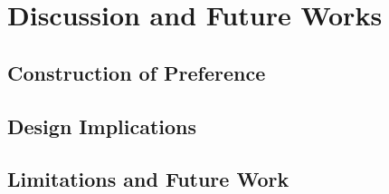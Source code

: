 \section{Discussion and Future Works}
\label{sec:discussion}

\subsection{Construction of Preference}

\subsection{Design Implications}

\subsection{Limitations and Future Work}
